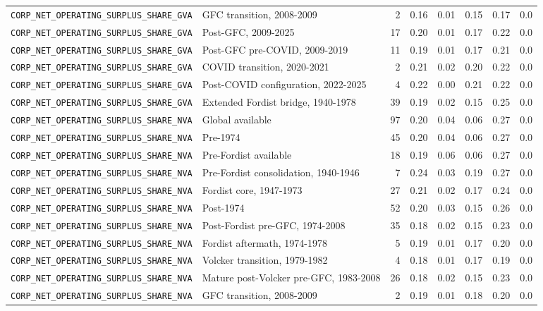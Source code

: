 \begin{landscape}
\begin{longtable}{p{4.4cm}p{3.8cm}rrrrrr}
\\
\nolinkurl{CORP_NET_OPERATING_SURPLUS_SHARE_GVA} & GFC transition, 2008-2009 & 2 & 0.16 & 0.01 & 0.15 & 0.17 & 0.0
\\
\nolinkurl{CORP_NET_OPERATING_SURPLUS_SHARE_GVA} & Post-GFC, 2009-2025 & 17 & 0.20 & 0.01 & 0.17 & 0.22 & 0.0
\\
\nolinkurl{CORP_NET_OPERATING_SURPLUS_SHARE_GVA} & Post-GFC pre-COVID, 2009-2019 & 11 & 0.19 & 0.01 & 0.17 & 0.21 & 0.0
\\
\nolinkurl{CORP_NET_OPERATING_SURPLUS_SHARE_GVA} & COVID transition, 2020-2021 & 2 & 0.21 & 0.02 & 0.20 & 0.22 & 0.0
\\
\nolinkurl{CORP_NET_OPERATING_SURPLUS_SHARE_GVA} & Post-COVID configuration, 2022-2025 & 4 & 0.22 & 0.00 & 0.21 & 0.22 & 0.0
\\
\nolinkurl{CORP_NET_OPERATING_SURPLUS_SHARE_GVA} & Extended Fordist bridge, 1940-1978 & 39 & 0.19 & 0.02 & 0.15 & 0.25 & 0.0
\\
\nolinkurl{CORP_NET_OPERATING_SURPLUS_SHARE_NVA} & Global available & 97 & 0.20 & 0.04 & 0.06 & 0.27 & 0.0
\\
\nolinkurl{CORP_NET_OPERATING_SURPLUS_SHARE_NVA} & Pre-1974 & 45 & 0.20 & 0.04 & 0.06 & 0.27 & 0.0
\\
\nolinkurl{CORP_NET_OPERATING_SURPLUS_SHARE_NVA} & Pre-Fordist available & 18 & 0.19 & 0.06 & 0.06 & 0.27 & 0.0
\\
\nolinkurl{CORP_NET_OPERATING_SURPLUS_SHARE_NVA} & Pre-Fordist consolidation, 1940-1946 & 7 & 0.24 & 0.03 & 0.19 & 0.27 & 0.0
\\
\nolinkurl{CORP_NET_OPERATING_SURPLUS_SHARE_NVA} & Fordist core, 1947-1973 & 27 & 0.21 & 0.02 & 0.17 & 0.24 & 0.0
\\
\nolinkurl{CORP_NET_OPERATING_SURPLUS_SHARE_NVA} & Post-1974 & 52 & 0.20 & 0.03 & 0.15 & 0.26 & 0.0
\\
\nolinkurl{CORP_NET_OPERATING_SURPLUS_SHARE_NVA} & Post-Fordist pre-GFC, 1974-2008 & 35 & 0.18 & 0.02 & 0.15 & 0.23 & 0.0
\\
\nolinkurl{CORP_NET_OPERATING_SURPLUS_SHARE_NVA} & Fordist aftermath, 1974-1978 & 5 & 0.19 & 0.01 & 0.17 & 0.20 & 0.0
\\
\nolinkurl{CORP_NET_OPERATING_SURPLUS_SHARE_NVA} & Volcker transition, 1979-1982 & 4 & 0.18 & 0.01 & 0.17 & 0.19 & 0.0
\\
\nolinkurl{CORP_NET_OPERATING_SURPLUS_SHARE_NVA} & Mature post-Volcker pre-GFC, 1983-2008 & 26 & 0.18 & 0.02 & 0.15 & 0.23 & 0.0
\\
\nolinkurl{CORP_NET_OPERATING_SURPLUS_SHARE_NVA} & GFC transition, 2008-2009 & 2 & 0.19 & 0.01 & 0.18 & 0.20 & 0.0

\end{longtable}
\end{landscape}
